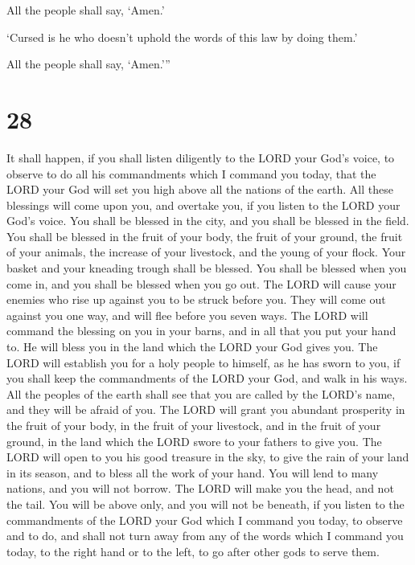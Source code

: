 All the people shall say, `Amen.'

 `Cursed is he who doesn't uphold the words of this law
by doing them.'

All the people shall say, `Amen.'''

\hypertarget{section-27}{%
\section{28}\label{section-27}}

 It shall happen, if you shall listen diligently to the
LORD your God's voice, to observe to do all his commandments which I
command you today, that the LORD your God will set you high above all
the nations of the earth.  All these blessings will come
upon you, and overtake you, if you listen to the LORD your God's voice.
 You shall be blessed in the city, and you shall be
blessed in the field.  You shall be blessed in the fruit
of your body, the fruit of your ground, the fruit of your animals, the
increase of your livestock, and the young of your flock. 
Your basket and your kneading trough shall be blessed. 
You shall be blessed when you come in, and you shall be blessed when you
go out.  The LORD will cause your enemies who rise up
against you to be struck before you. They will come out against you one
way, and will flee before you seven ways.  The LORD will
command the blessing on you in your barns, and in all that you put your
hand to. He will bless you in the land which the LORD your God gives
you.  The LORD will establish you for a holy people to
himself, as he has sworn to you, if you shall keep the commandments of
the LORD your God, and walk in his ways.  All the peoples
of the earth shall see that you are called by the LORD's name, and they
will be afraid of you.  The LORD will grant you abundant
prosperity in the fruit of your body, in the fruit of your livestock,
and in the fruit of your ground, in the land which the LORD swore to
your fathers to give you.  The LORD will open to you his
good treasure in the sky, to give the rain of your land in its season,
and to bless all the work of your hand. You will lend to many nations,
and you will not borrow.  The LORD will make you the
head, and not the tail. You will be above only, and you will not be
beneath, if you listen to the commandments of the LORD your God which I
command you today, to observe and to do,  and shall not
turn away from any of the words which I command you today, to the right
hand or to the left, to go after other gods to serve them.

